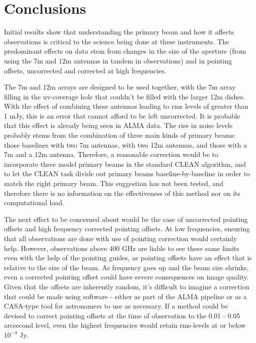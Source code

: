 \documentclass[11pt]{article}
\begin{document}

\section{Conclusions}

Initial results show that understanding the primary beam and how it affects
observations is critical to the science being done at these instruments. The
predominant effects on data stem from changes in the size of the aperture
(from using the 7m and 12m antennas in tandem in observations) and in
pointing offsets, uncorrected and corrected at high frequencies. 

The 7m and 12m arrays are designed to be used together, with the 7m array 
filling in the uv-coverage hole that couldn't be filled with the larger 12m 
dishes. With the effect of combining these antennas leading to rms levels of 
greater than 1 mJy, this is an error that cannot afford to be left uncorrected.  
It is probable that this effect is already being seen in ALMA data. The rise in
noise levels probably stems from the combination of three main kinds of
primary beams: those baselines with two 7m antennas, with two 12m
antennas, and those with a 7m and a 12m antenna. Therefore, a reasonable
correction would be to incorporate three model primary beams in the standard
CLEAN algorithm, and to let the CLEAN task divide out primary beams
baseline-by-baseline in order to match the right primary beam. This
suggestion has not been tested, and therefore there is no information on the
effectiveness of this method nor on its computational load.

The next effect to be concerned about would be the case of uncorrected pointing 
offsets and high frequency corrected pointing offsets.
At low frequencies, ensuring that all observations are done with use of 
pointing correction would certainly help. However, observations above 400 GHz 
are liable to see these same limits even with the help of the pointing guides, 
as pointing offsets have an effect that is relative to the size of the beam. As 
frequency goes up and the beam size shrinks, even a corrected pointing offset 
could have severe consequences on image quality. Given that the offsets are 
inherently random, it's difficult to imagine a correction that could be made 
using software - either as part of the ALMA pipeline or as a CASA-type tool for 
astronomers to use as necessary.  If a method could be devised to correct 
pointing offsets at the time of observation to the 0.01 - 0.05 arcsecond level, 
even the highest frequencies would retain rms-levels at or below $10^{-4}$ Jy.
\end{document}
